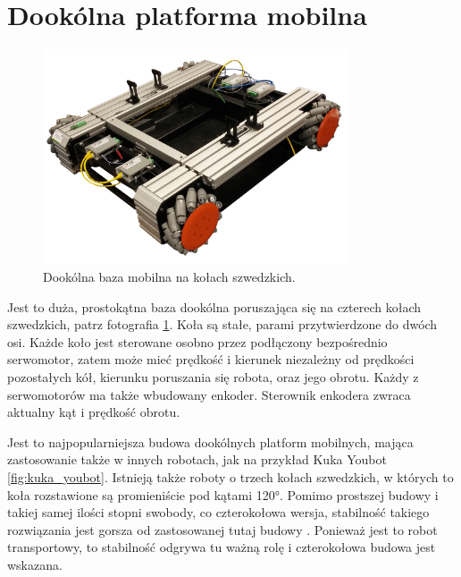 \section{Dookólna platforma mobilna}
	\begin{figure}[H]
	\centering
	\includegraphics[width=0.8\textwidth]{graphics/base_photo.png}
	\caption{Dookólna baza mobilna na kołach szwedzkich.}
	\label{fig:base_photo}
	\end{figure} 

	Jest to duża, prostokątna baza dookólna poruszająca się na czterech kołach szwedzkich, patrz fotografia \ref{fig:base_photo}.
	Koła są stałe, parami przytwierdzone do dwóch osi.
	Każde koło jest sterowane osobno przez podłączony bezpośrednio serwomotor, 
	zatem może mieć prędkość i kierunek niezależny od prędkości pozostałych kół, kierunku poruszania się robota, oraz jego obrotu.
	Każdy z serwomotorów ma także wbudowany enkoder.
	Sterownik enkodera zwraca aktualny kąt i prędkość obrotu.

	Jest to najpopularniejsza budowa dookólnych platform mobilnych, mająca zastosowanie także w innych robotach, jak na przykład Kuka Youbot \ref{fig:kuka_youbot}.
	Istnieją także roboty o trzech kołach szwedzkich, w których to koła rozstawione są promieniście pod kątami 120°.
	Pomimo prostszej budowy i takiej samej ilości stopni swobody, co czterokołowa wersja, stabilność takiego rozwiązania jest gorsza od zastosowanej tutaj budowy \cite{extra_axis}.
	Ponieważ jest to robot transportowy, to stabilność odgrywa tu ważną rolę i czterokołowa budowa jest wskazana.


